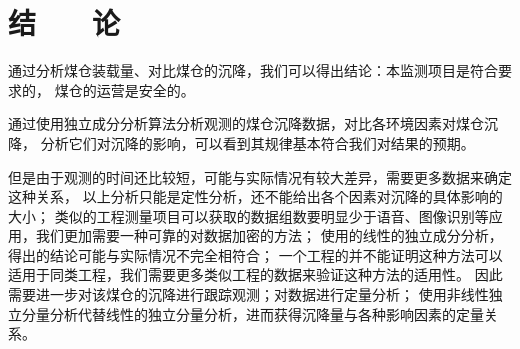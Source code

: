 
\chapter*{\hfill 结　　论 \hfill}

通过分析煤仓装载量、对比煤仓的沉降，我们可以得出结论：本监测项目是符合要求的，
煤仓的运营是安全的。

通过使用独立成分分析算法分析观测的煤仓沉降数据，对比各环境因素对煤仓沉降，
分析它们对沉降的影响，可以看到其规律基本符合我们对结果的预期。

但是由于观测的时间还比较短，可能与实际情况有较大差异，需要更多数据来确定这种关系，
以上分析只能是定性分析，还不能给出各个因素对沉降的具体影响的大小；
类似的工程测量项目可以获取的数据组数要明显少于语音、图像识别等应用，我们更加需要一种可靠的对数据加密的方法；
使用的线性的独立成分分析，得出的结论可能与实际情况不完全相符合；
一个工程的并不能证明这种方法可以适用于同类工程，我们需要更多类似工程的数据来验证这种方法的适用性。
因此需要进一步对该煤仓的沉降进行跟踪观测；对数据进行定量分析；
使用非线性独立分量分析代替线性的独立分量分析，进而获得沉降量与各种影响因素的定量关系。
